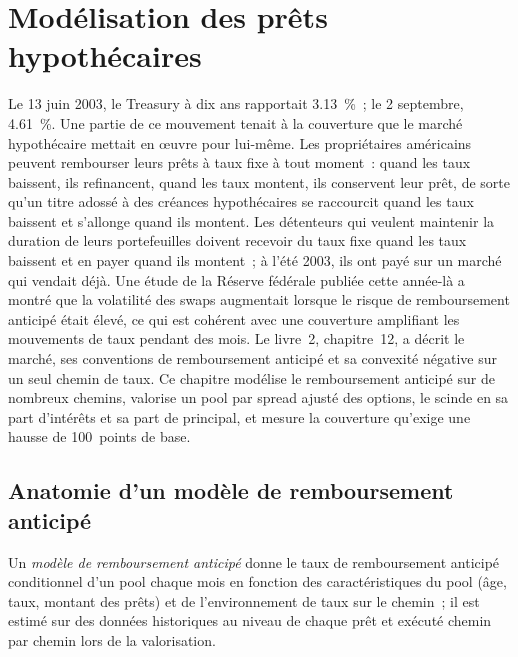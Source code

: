 \chapter{Modélisation des prêts hypothécaires}\label{ch:rc:mortgage-modelling}

Le 13 juin 2003, le Treasury à dix ans rapportait 3.13~\%~; le 2 septembre, 4.61~\%. Une partie
de ce mouvement tenait à la couverture que le marché hypothécaire mettait en œuvre pour lui-même. Les propriétaires
américains peuvent rembourser leurs prêts à taux fixe à tout moment~: quand les taux baissent, ils refinancent, quand les taux
montent, ils conservent leur prêt, de sorte qu'un titre adossé à des créances hypothécaires se raccourcit quand les taux baissent
et s'allonge quand ils montent. Les détenteurs qui veulent maintenir la duration de leurs portefeuilles doivent recevoir du taux fixe
quand les taux baissent et en payer quand ils montent~; à l'été 2003, ils ont payé sur un marché qui vendait déjà. Une étude
de la Réserve fédérale publiée cette année-là a montré que la volatilité des swaps
augmentait lorsque le risque de remboursement anticipé était élevé, ce qui est cohérent avec une couverture amplifiant
les mouvements de taux pendant des mois. Le livre~2, chapitre~12, a décrit le marché, ses conventions de remboursement
anticipé et sa convexité négative sur un seul chemin de taux. Ce chapitre modélise le remboursement anticipé sur de nombreux chemins,
valorise un pool par spread ajusté des options, le scinde en sa part d'intérêts et sa part de principal, et
mesure la couverture qu'exige une hausse de
100~points de base.

\section{Anatomie d'un modèle de remboursement anticipé}

\begin{definition}\label{def:rc:mortgage-modelling:model}
Un \emph{modèle de remboursement anticipé} donne le taux de remboursement anticipé conditionnel
d'un pool chaque mois en fonction des caractéristiques du pool (âge, taux, montant des prêts)
et de l'environnement de taux sur le chemin~; il est estimé sur des données historiques
au niveau de chaque prêt et exécuté chemin par chemin lors de la valorisation.
\end{definition}

